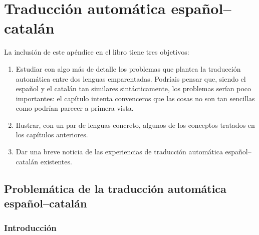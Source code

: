 \chapter{Traducción automática español--catalán} \label{se:PdTACC} 

La inclusión de este apéndice en el libro tiene tres objetivos: \begin{enumerate} \item Estudiar con algo más de detalle los problemas que plantea la traducción automática entre dos lenguas emparentadas. Podríais pensar que, siendo el español y el catalán tan similares sintácticamente, los problemas serían poco importantes: el capítulo intenta convenceros que las cosas no son tan sencillas como podrían parecer a primera vista. \item Ilustrar, con un par de lenguas concreto, algunos de los conceptos tratados en los capítulos anteriores. \item Dar una breve noticia de las experiencias de traducción automática español--catalán existentes. \end{enumerate} 

\section{Problemática de la traducción automática español--catalán} 

\subsection{Introducción} 

